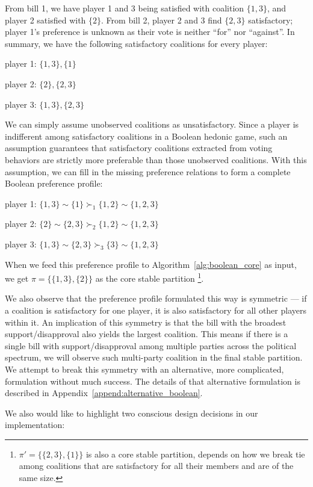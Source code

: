 From bill 1, we have player 1 and 3 being satisfied with coalition $\{1, 3\}$,
and player 2 satisfied with $\{2\}$.
From bill 2, player 2 and 3 find $\{2, 3\}$ satisfactory; player 1's preference
is unknown as their vote is neither ``for'' nor ``against''.
In summary, we have the following satisfactory coalitions for every player:

player 1: $\{1, 3\}, \{1\}$

player 2: $\{2\}, \{2, 3\}$

player 3: $\{1, 3\}, \{2, 3\}$

We can simply assume unobserved coalitions as unsatisfactory.
Since a player is indifferent among satisfactory coalitions in a Boolean hedonic
game, such an assumption guarantees that satisfactory coalitions extracted from
voting behaviors are strictly more preferable than those unobserved coalitions.
With this assumption, we can fill in the missing preference relations to
form a complete Boolean preference profile:

player 1: $\{1, 3\} \sim \{1\} \succ_1 \{1, 2\} \sim \{1, 2, 3\}$

player 2: $\{2\} \sim \{2, 3\} \succ_2 \{1, 2\} \sim \{1, 2, 3\}$

player 3: $\{1, 3\} \sim \{2, 3\} \succ_3 \{3\} \sim \{1, 2, 3\}$

When we feed this preference profile to Algorithm~\ref{alg:boolean_core} as input, we
get $\pi = \{\{1, 3\}, \{2\}\}$ as the core stable partition
\footnote{$\pi' = \{\{2, 3\}, \{1\}\}$ is also a core stable partition, depends
on how we break tie among coalitions that are satisfactory for all their members
and are of the same size.}.

We also observe that the preference profile formulated this way is symmetric ---
if a coalition is satisfactory for one player, it is also satisfactory for all
other players within it.
An implication of this symmetry is that the bill with the broadest
support/disapproval also yields the largest coalition.
This means if there is a single bill with support/disapproval among multiple
parties across the political spectrum, we will observe such multi-party
coalition in the final stable partition.
We attempt to break this symmetry with an alternative, more complicated,
formulation without much success.
The details of that alternative formulation is described in
Appendix~\ref{append:alternative_boolean}.

We also would like to highlight two conscious design decisions in our
implementation:


